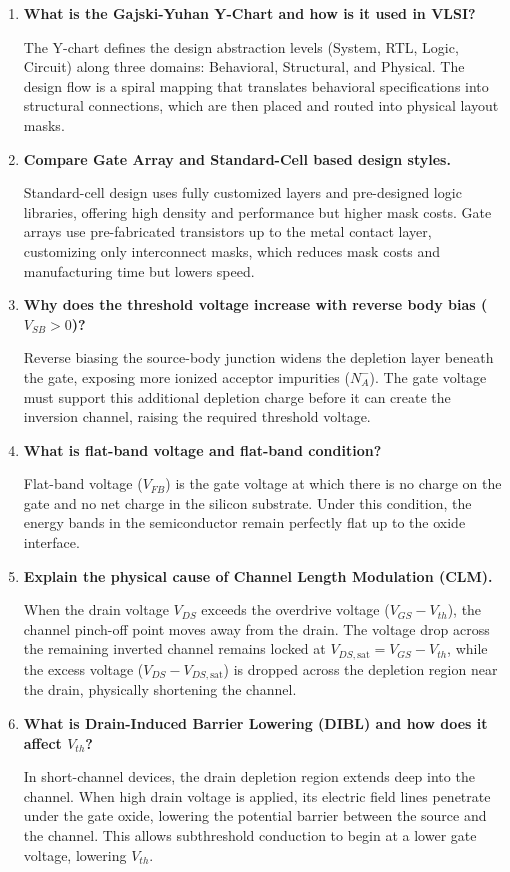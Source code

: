 \documentclass[12pt,a4paper]{article}
\newcommand{\Q}[1]{\textbf{#1}\par\noindent\ignorespaces}
\begin{document}
\begin{tcolorbox}[exambox, title={\textbf{Frequently Asked / Viva Questions}}]
\begin{enumerate}[topsep=0pt, label=\textbf{Q\arabic*.}, itemsep=5pt]
  \item \Q{What is the Gajski-Yuhan Y-Chart and how is it used in VLSI?}
    The Y-chart defines the design abstraction levels (System, RTL, Logic, Circuit) along three domains: Behavioral, Structural, and Physical. The design flow is a spiral mapping that translates behavioral specifications into structural connections, which are then placed and routed into physical layout masks.
  \item \Q{Compare Gate Array and Standard-Cell based design styles.}
    Standard-cell design uses fully customized layers and pre-designed logic libraries, offering high density and performance but higher mask costs. Gate arrays use pre-fabricated transistors up to the metal contact layer, customizing only interconnect masks, which reduces mask costs and manufacturing time but lowers speed.
  \item \Q{Why does the threshold voltage increase with reverse body bias ($V_{SB} > 0$)?}
    Reverse biasing the source-body junction widens the depletion layer beneath the gate, exposing more ionized acceptor impurities ($N_A^-$). The gate voltage must support this additional depletion charge before it can create the inversion channel, raising the required threshold voltage.
  \item \Q{What is flat-band voltage and flat-band condition?}
    Flat-band voltage ($V_{FB}$) is the gate voltage at which there is no charge on the gate and no net charge in the silicon substrate. Under this condition, the energy bands in the semiconductor remain perfectly flat up to the oxide interface.
  \item \Q{Explain the physical cause of Channel Length Modulation (CLM).}
    When the drain voltage $V_{DS}$ exceeds the overdrive voltage ($V_{GS} - V_{th}$), the channel pinch-off point moves away from the drain. The voltage drop across the remaining inverted channel remains locked at $V_{DS,\text{sat}} = V_{GS} - V_{th}$, while the excess voltage ($V_{DS} - V_{DS,\text{sat}}$) is dropped across the depletion region near the drain, physically shortening the channel.
  \item \Q{What is Drain-Induced Barrier Lowering (DIBL) and how does it affect $V_{th}$?}
    In short-channel devices, the drain depletion region extends deep into the channel. When high drain voltage is applied, its electric field lines penetrate under the gate oxide, lowering the potential barrier between the source and the channel. This allows subthreshold conduction to begin at a lower gate voltage, lowering $V_{th}$.

\end{enumerate}
\end{tcolorbox}
\end{document}
